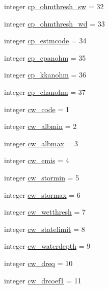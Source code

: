 \begin{DoxyCompactItemize}
\item 
integer \hyperlink{namespacecolnamesinputfiles_ad9ce7d210b2b7e49fea86542362b5ab2}{cp\+\_\+ohmthresh\+\_\+sw} = 32
\item 
integer \hyperlink{namespacecolnamesinputfiles_a813cd1538cabdd1fad4f6ae8bc896f19}{cp\+\_\+ohmthresh\+\_\+wd} = 33
\item 
integer \hyperlink{namespacecolnamesinputfiles_a9d8a7aee77237f63b58fe379accd6ca9}{cp\+\_\+estmcode} = 34
\item 
integer \hyperlink{namespacecolnamesinputfiles_a20049a097f86cbe9cf312c3d3878d599}{cp\+\_\+cpanohm} = 35
\item 
integer \hyperlink{namespacecolnamesinputfiles_aa1d94ae99499960a4112975fef2b8461}{cp\+\_\+kkanohm} = 36
\item 
integer \hyperlink{namespacecolnamesinputfiles_a99f7646fb532e72d0b9ee394a0c6b959}{cp\+\_\+chanohm} = 37
\item 
integer \hyperlink{namespacecolnamesinputfiles_a6bfc20ed12c3fa0314aba2ba9a1bb72d}{cw\+\_\+code} = 1
\item 
integer \hyperlink{namespacecolnamesinputfiles_a3e2bab3cbac3f65034190eb40a6a720d}{cw\+\_\+albmin} = 2
\item 
integer \hyperlink{namespacecolnamesinputfiles_af2bcac281281f5be23251704befc41d6}{cw\+\_\+albmax} = 3
\item 
integer \hyperlink{namespacecolnamesinputfiles_a242bb5c78651ec63ffdb8d8ce1fb4803}{cw\+\_\+emis} = 4
\item 
integer \hyperlink{namespacecolnamesinputfiles_ab9b7bbe6f000d46892c066dc0586a9b3}{cw\+\_\+stormin} = 5
\item 
integer \hyperlink{namespacecolnamesinputfiles_afdb6de5a5e1d3f406ad7cfd67ef16f42}{cw\+\_\+stormax} = 6
\item 
integer \hyperlink{namespacecolnamesinputfiles_ae8900c6d6e9eb550cf1c702acb65dc20}{cw\+\_\+wetthresh} = 7
\item 
integer \hyperlink{namespacecolnamesinputfiles_a34c411defdc0da75fe0d6854e45b266a}{cw\+\_\+statelimit} = 8
\item 
integer \hyperlink{namespacecolnamesinputfiles_add367c34c8e4c7d6b2e3e6a1cea6d4cb}{cw\+\_\+waterdepth} = 9
\item 
integer \hyperlink{namespacecolnamesinputfiles_acf7a03c96513d8c30d986353cab6f4e4}{cw\+\_\+dreq} = 10
\item 
integer \hyperlink{namespacecolnamesinputfiles_ac4a304c5958bff88e372fa04cc7b2ed6}{cw\+\_\+drcoef1} = 11
\item 

\end{DoxyCompactItemize}
